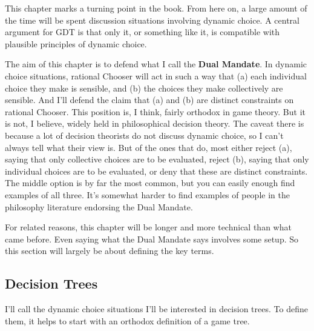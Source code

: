 \documentclass[
  12pt,
  letterpaper,
  DIV=11,
  numbers=noendperiod]{scrreprt}
\begin{document}
This chapter marks a turning point in the book. From here on, a large
amount of the time will be spent discussion situations involving dynamic
choice. A central argument for GDT is that only it, or something like
it, is compatible with plausible principles of dynamic choice.

The aim of this chapter is to defend what I call the \textbf{Dual
Mandate}. In dynamic choice situations, rational Chooser will act in
such a way that (a) each individual choice they make is sensible, and
(b) the choices they make collectively are sensible. And I'll defend the
claim that (a) and (b) are distinct constraints on rational Chooser.
This position is, I think, fairly orthodox in game theory. But it is
not, I believe, widely held in philosophical decision theory. The caveat
there is because a lot of decision theorists do not discuss dynamic
choice, so I can't always tell what their view is. But of the ones that
do, most either reject (a), saying that only collective choices are to
be evaluated, reject (b), saying that only individual choices are to be
evaluated, or deny that these are distinct constraints. The middle
option is by far the most common, but you can easily enough find
examples of all three. It's somewhat harder to find examples of people
in the philosophy literature endorsing the Dual Mandate.

For related reasons, this chapter will be longer and more technical than
what came before. Even saying what the Dual Mandate says involves some
setup. So this section will largely be about defining the key terms.

\subsection{Decision Trees}\label{sec-decision-tree}

I'll call the dynamic choice situations I'll be interested in decision
trees. To define them, it helps to start with an orthodox definition of
a game tree.
\end{document}
